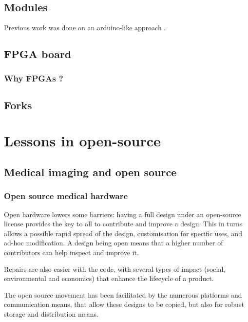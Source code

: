 \documentclass[conference]{IEEEtran}
\begin{document}
\subsection{Modules}


Previous work was done on an arduino-like approach \cite{jonveaux_arduino-like_2017}.

\subsection{FPGA board}

\subsubsection{Why FPGAs ?}

\cite{zhang_fpga_2012}


\subsection{Forks}

\section{Lessons in open-source}

\subsection{Medical imaging and open source}

\subsubsection{Open source medical hardware}

Open hardware lowers some barriers: having a full design under an open-source license provides the key to all to contribute and improve a design. This in turns allows a possible rapid spread of the design, customisation for specific uses, and ad-hoc modification. A design being open means that a higher number of contributors can help inspect and improve it.

Repairs are also easier with the code, with several types of impact (social, environmental and economics) that enhance the lifecycle of a product.

The open source movement has been facilitated by the numerous platforms and communication means, that allow these designs to be copied, but also for robust storage and distribution means. 
\end{document}
